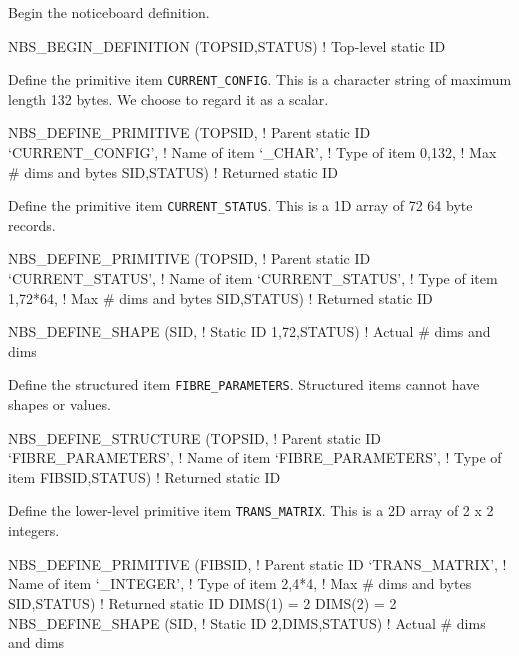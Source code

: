 \documentclass[twoside,11pt,nolof]{starlink}
\begin{document}
Begin the noticeboard definition.

\begin{terminalv}
NBS_BEGIN_DEFINITION (TOPSID,STATUS)      ! Top-level static ID
\end{terminalv}

Define the primitive item \texttt{CURRENT\_CONFIG}. This is a character string
of maximum length 132 bytes. We choose to regard it as a scalar.

\begin{terminalv}
NBS_DEFINE_PRIMITIVE (TOPSID,             ! Parent static ID
                      `CURRENT_CONFIG',   ! Name of item
                      `_CHAR',            ! Type of item
                      0,132,              ! Max # dims and bytes
                      SID,STATUS)         ! Returned static ID
\end{terminalv}

Define the primitive item \texttt{CURRENT\_STATUS}. This is a 1D array of 72 64
byte records.

\begin{terminalv}
NBS_DEFINE_PRIMITIVE (TOPSID,             ! Parent static ID
                      `CURRENT_STATUS',   ! Name of item
                      `CURRENT_STATUS',   ! Type of item
                      1,72*64,            ! Max # dims and bytes
                      SID,STATUS)         ! Returned static ID

NBS_DEFINE_SHAPE     (SID,                ! Static ID
                      1,72,STATUS)        ! Actual # dims and dims
\end{terminalv}

Define the structured item \texttt{FIBRE\_PARAMETERS}. Structured items cannot
have shapes or values.

\begin{terminalv}
NBS_DEFINE_STRUCTURE (TOPSID,             ! Parent static ID
                      `FIBRE_PARAMETERS', ! Name of item
                      `FIBRE_PARAMETERS', ! Type of item
                      FIBSID,STATUS)      ! Returned static ID
\end{terminalv}

Define the lower-level primitive item \texttt{TRANS\_MATRIX}. This is a 2D array
of 2 x 2 integers.

\begin{terminalv}
NBS_DEFINE_PRIMITIVE (FIBSID,             ! Parent static ID
                      `TRANS_MATRIX',     ! Name of item
                      `_INTEGER',         ! Type of item
                      2,4*4,              ! Max # dims and bytes
                      SID,STATUS)         ! Returned static ID
DIMS(1) = 2
DIMS(2) = 2
NBS_DEFINE_SHAPE     (SID,                ! Static ID
                      2,DIMS,STATUS)      ! Actual # dims and dims
\end{terminalv}
\end{document}
